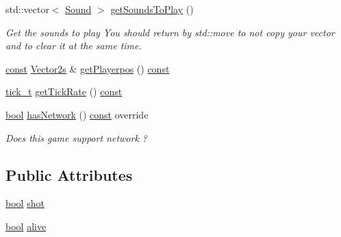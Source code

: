 \begin{DoxyCompactItemize}
std\-::vector$<$ \hyperlink{structarcade_1_1_sound}{Sound} $>$ \hyperlink{classarcade_1_1_centipede_game_ac5325cf0d8e5e00c6a9241865183d55b}{get\-Sounds\-To\-Play} ()
\begin{DoxyCompactList}\small\item\em Get the sounds to play You should return by std\-::move to not copy your vector and to clear it at the same time. \end{DoxyCompactList}\item 
\hyperlink{term__entry_8h_a57bd63ce7f9a353488880e3de6692d5a}{const} \hyperlink{namespacearcade_a8e527f7400fbff9c38dc31e0a3dd06a1}{Vector2s} \& \hyperlink{classarcade_1_1_centipede_game_a37b28cea0f4989de09dbb94ad843ab7f}{get\-Playerpos} () \hyperlink{term__entry_8h_a57bd63ce7f9a353488880e3de6692d5a}{const} 
\item 
\hyperlink{namespacearcade_a0310f1a25932c12488a64333351f88f6}{tick\-\_\-t} \hyperlink{classarcade_1_1_centipede_game_adb4c2b9b2b45aac64b6a460ba6b0f5ba}{get\-Tick\-Rate} () \hyperlink{term__entry_8h_a57bd63ce7f9a353488880e3de6692d5a}{const} 
\item 
\hyperlink{term__entry_8h_a002004ba5d663f149f6c38064926abac}{bool} \hyperlink{classarcade_1_1_centipede_game_aaa007b0b45cf5abd268d41915db5c914}{has\-Network} () \hyperlink{term__entry_8h_a57bd63ce7f9a353488880e3de6692d5a}{const} override
\begin{DoxyCompactList}\small\item\em Does this game support network ? \end{DoxyCompactList}\end{DoxyCompactItemize}
\subsection*{Public Attributes}
\begin{DoxyCompactItemize}
\item 
\hyperlink{term__entry_8h_a002004ba5d663f149f6c38064926abac}{bool} \hyperlink{classarcade_1_1_centipede_game_a85162871e41eff0a32942de54c07d851}{shot}
\item 
\hyperlink{term__entry_8h_a002004ba5d663f149f6c38064926abac}{bool} \hyperlink{classarcade_1_1_centipede_game_aa8436e95e4b81e44c0b89f07f43fc2bb}{alive}
\end{DoxyCompactItemize}


